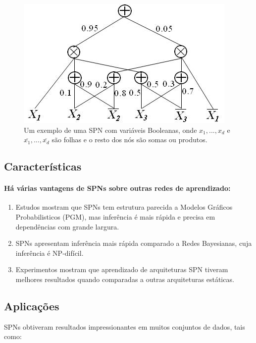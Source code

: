 \documentclass[a4paper,10pt]{article}
\theoremstyle{plain}
\begin{document}
\begin{figure}[h]
\centering\includegraphics[scale=0.7]{imgs/domingos_poon.jpg}
\caption{Um exemplo de uma SPN com variáveis Booleanas, onde $x_1,...,x_d$ e 
  $\overline{x_1},...,\overline{x_d}$ são folhas e o resto dos nós são somas ou produtos.\cite{poon-domingos}}
\end{figure}

\subsection{Características}

\paragraph{
  Há várias vantagens de SPNs sobre outras redes de aprendizado:
}

\begin{enumerate} \itemsep0pt
  \item Estudos mostram que SPNs tem estrutura parecida a Modelos Gráficos Probabilisticos (PGM), 
    mas inferência é mais rápida e precisa em dependências com grande largura.\cite{gens-domingos}
  \item SPNs apresentam inferência mais rápida comparado a Redes Bayesianas, cuja inferência é
    NP-difícil.
  \item Experimentos mostram que aprendizado de arquiteturas SPN tiveram melhores resultados quando
    comparadas a outras arquiteturas estáticas.\cite{clustering}
\end{enumerate}

\subsection{Aplicações}

SPNs obtiveram resultados impressionantes em muitos conjuntos de dados\cite{website:spn-uwashington}, tais como:
\end{document}

